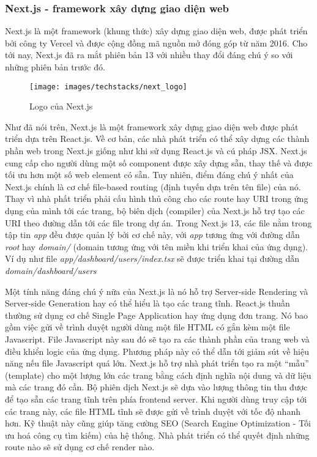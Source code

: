 \documentclass[../main.tex]{subfiles}
\begin{document}
	\subsubsection{Next.js - \Gls{framework} xây dựng giao diện web}

	Next.js là một \Gls{framework} (khung thức) xây dựng giao diện web, được phát triển bởi công ty Vercel và được cộng
	đồng mã nguồn mở đóng góp từ năm 2016. Cho tới nay, Next.js đã ra mắt phiên bản 13 với nhiều thay đổi đáng chú ý so
	với những phiên bản trước đó.

	\begin{figure}[ht]
		\centering
		\texttt{[image: images/techstacks/next\_logo]}
		\caption{Logo của Next.js}
		\label{fig:next-logo}
	\end{figure}

	Như đã nói trên, Next.js là một \Gls{framework} xây dựng giao diện web được phát triển dựa trên React.js. Về cơ bản,
	các nhà phát triển có thể xây dựng các thành phần web trong Next.js giống như khi sử dụng React.js và cú pháp JSX.
	Next.js cung cấp cho người dùng một số component được xây dựng sẵn, thay thế và được tối ưu hơn một số web element có
	sẵn. Tuy nhiên, điểm đáng chú ý nhất của Next.js chính là cơ chế file-based routing (định tuyến dựa trên tên file) của
	nó. Thay vì nhà phất triển phải cấu hình thủ công cho các route hay URI trong ứng dụng của mình tới các trang, bộ biên
	dịch (compiler) của Next.js hỗ trợ tạo các URI theo đường dẫn tới các file trong dự án. Trong Next.js 13, các file nằm
	trong tập tin \emph{app} đều được quản lý bởi cơ chế này, với \emph{app} tương ứng với đường dẫn \emph{root} hay
	\emph{domain/} (domain tương ứng với tên miền khi triển khai của ứng dụng). Ví dụ như file
	\emph{app/dashboard/users/index.tsx} sẽ được triển khai tại đường dẫn \emph{domain/dashboard/users}

	Một tính năng đáng chú ý nữa của Next.js là nó hỗ trợ Server-side Rendering và Server-side Generation hay có thể hiểu
	là tạo các trang tĩnh. React.js thuần thường sử dụng cơ chế Single Page Application hay ứng dụng đơn trang. Nó bao gồm
	việc gửi về trình duyệt người dùng một file HTML có gắn kèm một file Javascript. File Javascript này sau đó sẽ tạo ra
	các thành phần của trang web và điều khiển logic của ứng dụng. Phương pháp này có thể dẫn tới giảm sút về hiệu năng
	nếu file Javascript quá lớn. Next.js hỗ trợ nhà phát triển tạo ra một ``mẫu'' (template) cho một lượng lớn các trang
	bằng cách định nghĩa nội dung và dữ liệu mà các trang đó cần. Bộ phiên dịch Next.js sẽ dựa vào lượng thông tin thu
	được để tạo sẵn các trang tĩnh trên phía \Gls{frontend} server. Khi người dùng truy cập tới các trang này, các file
	HTML tĩnh sẽ được gửi về trình duyệt với tốc độ nhanh hơn. Kỹ thuật này cũng giúp tăng cường SEO (Search Engine
	Optimization - Tối ưu hoá công cụ tìm kiếm) của hệ thống. Nhà phát triển có thể quyết định những route nào sẽ sử dụng
	cơ chế render nào.
\end{document}
